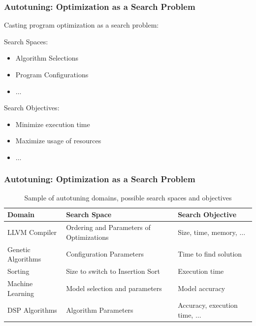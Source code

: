 \documentclass[10pt, compress, aspectratio=169]{beamer}
\begin{document}
\begin{frame}
    \frametitle{Autotuning: Optimization as a Search Problem}
    Casting program optimization as a \alert{search problem}:

    \alert{Search Spaces}:
    \begin{itemize}
        \item Algorithm Selections
        \item Program Configurations
        \item $\dots$
    \end{itemize}

    \alert{Search Objectives}:
    \begin{itemize}
        \item Minimize \alert{execution time}
        \item Maximize \alert{usage of resources}
        \item $\dots$
    \end{itemize}
\end{frame}

\begin{frame}
    \frametitle{Autotuning: Optimization as a Search Problem}
    \begin{table}[]
        \centering
        \begin{tabular}{@{}lll@{}}
            \toprule
            Domain & Search Space & Search Objective \\ \midrule
            LLVM Compiler & Ordering and Parameters of Optimizations & Size, time, memory, $\dots$ \\
            Genetic Algorithms & Configuration Parameters & Time to find solution \\
            Sorting & Size to switch to Insertion Sort & Execution time \\
            Machine Learning & Model selection and parameters & Model accuracy \\
            DSP Algorithms & Algorithm Parameters & Accuracy, execution time, $\dots$ \\ \bottomrule
        \end{tabular}
        \caption{Sample of autotuning domains, possible search spaces and objectives}
    \end{table}
\end{frame}
\end{document}
